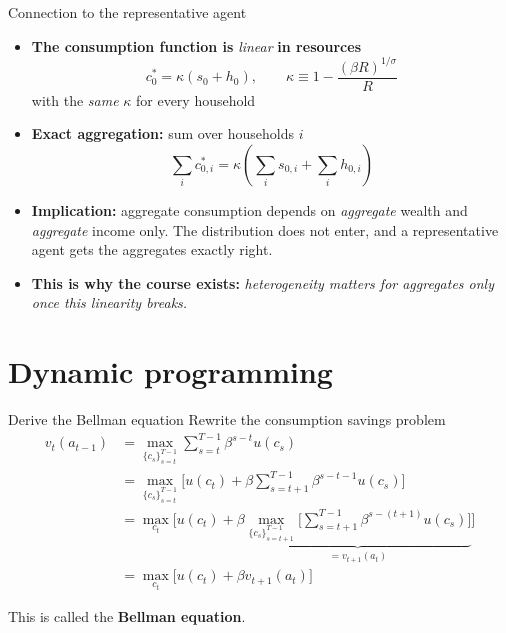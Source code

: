 \documentclass[
  10pt,
  ignorenonframetext,
  aspectratio=43,
  english,
]{beamer}
\begin{document}
\begin{frame}{Connection to the representative agent}
\protect{}\label{connection-to-the-representative-agent}
\begin{itemize}
\item
  \textbf{The consumption function is} \emph{linear} \textbf{in
  resources} \[
    c^{\ast}_{0}=\kappa\left(s_{0}+h_{0}\right),\qquad\kappa\equiv1-\frac{(\beta R)^{1/\sigma}}{R}
    \] with the \emph{same} \(\kappa\) for every household
\item
  \textbf{Exact aggregation:} sum over households \(i\)
  \[ \sum_{i}c^{\ast}_{0,i}=\kappa\left(\sum_{i}s_{0,i}+\sum_{i}h_{0,i}\right)
    \]
\item
  \textbf{Implication:} aggregate consumption depends on
  \emph{aggregate} wealth and \emph{aggregate} income only. The
  distribution does not enter, and a representative agent gets the
  aggregates exactly right.
\item
  \textbf{This is why the course exists:} \emph{heterogeneity matters
  for aggregates only once this linearity breaks.}
\end{itemize}
\end{frame}

\section{Dynamic programming}\label{dynamic-programming}

\begin{frame}{Derive the Bellman equation}
\protect{}\label{derive-the-bellman-equation}
Rewrite the consumption savings problem \[
\begin{aligned}
    v_{t}(a_{t-1}) &= \max_{\{c_{s}\}_{s=t}^{T-1}} \sum_{s=t}^{T-1} \beta^{s-t} u(c_{s}) \\
    &= \max_{\{c_{s}\}_{s=t}^{T-1}} \Big[ u(c_{t}) + \beta \sum_{s=t+1}^{T-1}  \beta^{s-t-1} u(c_{s})\Big] \\
    &= \max_{c_{t}} \Bigg[ u(c_{t}) + \beta \underbrace{\max_{\{c_{s}\}_{s=t+1}^{T-1}}\Big[ \sum_{s=t+1}^{T-1}  \beta^{s-(t+1)} u(c_{s})\Big]}_{=v_{t+1}(a_{t})} \Bigg]  \\
    &= \max_{c_{t}} \Big[ u(c_{t})+\beta v_{t+1}(a_{t})\Big]
\end{aligned}
\]

This is called the \textbf{Bellman equation}.
\end{frame}
\end{document}
